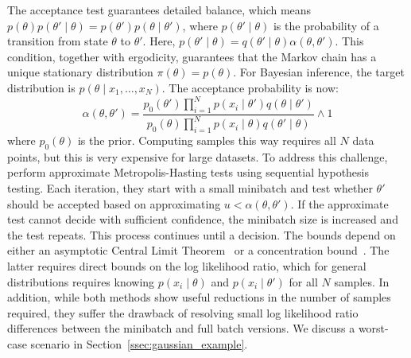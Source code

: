 \documentclass{article}
\begin{document}
The acceptance test guarantees detailed balance, which means
$p(\theta)p(\theta'\mid\theta) = p(\theta')p(\theta \mid\theta')$, where
$p(\theta'\mid\theta)$ is the probability of a transition from state $\theta$ to
$\theta'$. Here, $p(\theta'\mid\theta)=q(\theta'\mid\theta)\alpha(\theta,\theta')$.
This condition, together with ergodicity, guarantees that the Markov chain has a
unique stationary distribution $\pi(\theta) = p(\theta)$. For Bayesian
inference, the target distribution is $p(\theta \mid x_1, \ldots, x_N)$. The
acceptance probability is now:
\begin{equation}\label{eq:acceptance_probability}
    \alpha(\theta,\theta') = 
    \frac{p_0(\theta')\prod_{i=1}^N p(x_i \mid \theta')q(\theta \mid
    \theta')}{p_0(\theta)\prod_{i=1}^N p(x_i \mid \theta)q(\theta' \mid\theta)}
    \wedge 1
\end{equation}
where $p_0(\theta)$ is the prior. Computing samples this way requires all $N$
data points, but this is very expensive for large datasets. To address this
challenge,~\cite{cutting_mh_2014,icml2014c1_bardenet14} perform approximate
Metropolis-Hasting tests using sequential hypothesis testing. Each iteration,
they start with a small minibatch and test whether $\theta'$ should be accepted
based on approximating $u<\alpha(\theta,\theta')$. If the approximate test
cannot decide with sufficient confidence, the minibatch size is increased and
the test repeats. This process continues until a decision. The bounds depend on
either an asymptotic Central Limit Theorem~\cite{cutting_mh_2014} or a
concentration bound~\cite{icml2014c1_bardenet14}. The latter requires direct
bounds on the log likelihood ratio, which for general distributions requires
knowing $p(x_i \mid \theta)$ and $p(x_i \mid \theta')$ for all $N$ samples. In
addition, while both methods show useful reductions in the number of samples
required, they suffer the drawback of resolving small log likelihood ratio
differences between the minibatch and full batch versions. We discuss a
worst-case scenario in Section~\ref{ssec:gaussian_example}.
\end{document}
